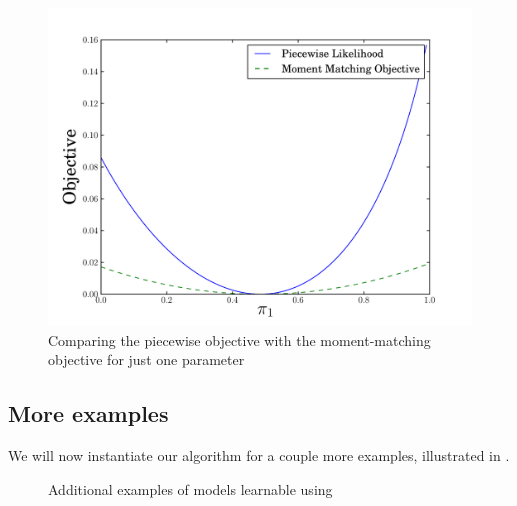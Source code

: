 \begin{figure}
  \centering
  \includegraphics[width=\columnwidth]{figures/piecewise-objective.pdf}
  \caption{Comparing the piecewise objective with the moment-matching objective for just one parameter}
  \label{fig:piecewise-objective}
\end{figure}

\subsection{More examples}

We will now instantiate our algorithm for a couple more examples, illustrated in .

\begin{figure}
  \caption{Additional examples of models learnable using \LearnMarginals {}}
  \label{fig:examples}
\end{figure}

